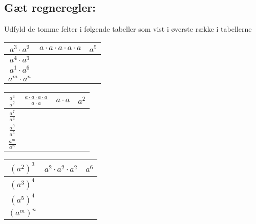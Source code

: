 \subsection*{Gæt regneregler:}

Udfyld de tomme felter i følgende tabeller som vist i øverste række i tabellerne

\bgroup
\def\arraystretch{2}

\begin{center}

\begin{tabular}{|c|c|c|}
	\hline
	$a^3\cdot a^2$ & \hspace{2.5cm} $a\cdot a\cdot a\cdot a\cdot a$\hspace{2.5cm} & $a^5$\\
	\hline
	$a^4 \cdot a^3$ & & \\
	\hline
	$a^1 \cdot a^6$ & & \\
	\hline
	$a^m\cdot a^n $ & & \\
	\cline{1-1}
	\cline{3-3}
\end{tabular} 


\begin{tabular}{|c|c|c|c|}
	\hline
	$\frac{a^4}{a^2}$ &\hspace{2cm} $\frac{a \cdot a \cdot a \cdot a}{a \cdot a}$\hspace{2cm} & \hspace{1cm} $a\cdot a$ \hspace{1cm} & $a^2$\\
	\hline
	$\frac{a^7}{a^4}$ & & &\\
	\hline
	$\frac{a^9}{a^5}$ & & &\\
	\hline
	$\frac{a^m}{a^n} $ &  & &\\
	\cline{1-1} 
	\cline{4-4}
\end{tabular}


\begin{tabular}{|c|c|c|}
	\hline
	$(a^2)^3$ &\hspace{2cm} $a^2\cdot a^2 \cdot a^2$\hspace{2cm}   & $a^6$\\
	\hline
	$(a^3)^4$ &  &\\
	\hline
	$(a^5)^4$ &  &\\
	\hline
	$(a^m)^n $ &   &\\
	\cline{1-1} 
	\cline{3-3}
\end{tabular}


\end{center}
